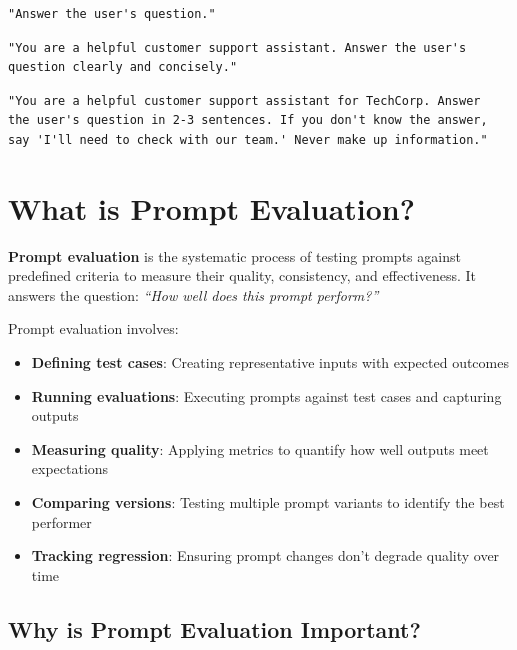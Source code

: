 \documentclass[11pt,a4paper]{report}
\begin{document}
\begin{lstlisting}[style=yaml,title={Version 1 (Basic)}]
"Answer the user's question."
\end{lstlisting}

\begin{lstlisting}[style=yaml,title={Version 2 (With context)}]
"You are a helpful customer support assistant. Answer the user's
question clearly and concisely."
\end{lstlisting}

\begin{lstlisting}[style=yaml,title={Version 3 (With constraints)}]
"You are a helpful customer support assistant for TechCorp. Answer
the user's question in 2-3 sentences. If you don't know the answer,
say 'I'll need to check with our team.' Never make up information."
\end{lstlisting}

\section{What is Prompt Evaluation?}

\textbf{Prompt evaluation} is the systematic process of testing prompts against predefined criteria to measure their quality, consistency, and effectiveness. It answers the question: \textit{``How well does this prompt perform?''}

Prompt evaluation involves:

\begin{itemize}
    \item \textbf{Defining test cases}: Creating representative inputs with expected outcomes
    \item \textbf{Running evaluations}: Executing prompts against test cases and capturing outputs
    \item \textbf{Measuring quality}: Applying metrics to quantify how well outputs meet expectations
    \item \textbf{Comparing versions}: Testing multiple prompt variants to identify the best performer
    \item \textbf{Tracking regression}: Ensuring prompt changes don't degrade quality over time
\end{itemize}

\subsection{Why is Prompt Evaluation Important?}
\end{document}
